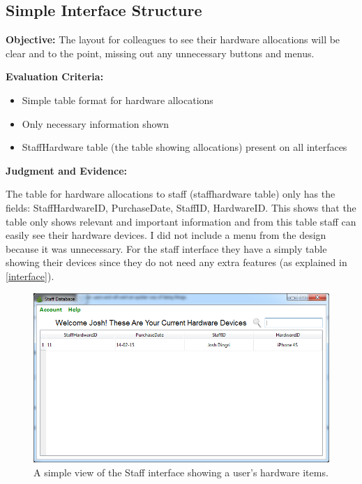 \subsection{Simple Interface Structure}

\textbf{Objective:} The layout for colleagues to see their hardware allocations will be clear and to the point, missing out any unnecessary buttons and menus.

\textbf{Evaluation Criteria:}
\begin{itemize}
\item{Simple table format for hardware allocations}
\item{Only necessary information shown}
\item{StaffHardware table (the table showing allocations) present on all interfaces}
\end{itemize}

\textbf{Judgment and Evidence:}

The table for hardware allocations to staff (staffhardware table) only has the fields: StaffHardwareID, PurchaseDate, StaffID, HardwareID. This shows that the table only shows relevant and important information and from this table staff can easily see their hardware devices. I did not include a menu from the design because it was unnecessary. For the staff interface they have a simply table showing their devices  since they do not need any extra features (as explained in \ref{interface}).

\begin{figure}[H]
    \includegraphics[width=\textwidth]{./Evaluation/Images/staffhardwaredevice.png}
    \caption{A simple view of the Staff interface showing a user's hardware items.} 
\end{figure}


